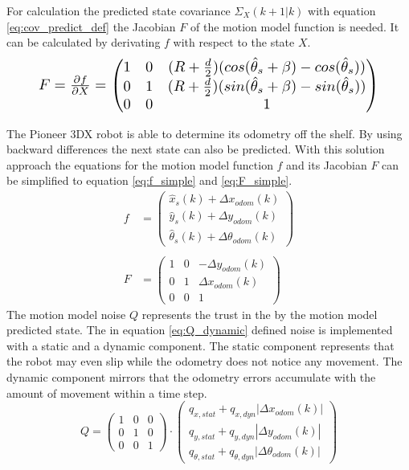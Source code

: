 For calculation the predicted state covariance $\Sigma_{X}(k+1|k)$ with equation \eqref{eq:cov_predict_def} the Jacobian $F$ of the motion model function is needed. It can be calculated by derivating $f$ with respect to the state $X$.
\begin{equation}\label{eq:MotionModel}
    \resizebox{0.88\hsize}{!}{%
        $F = \frac{\partial f}{\partial X} = \begin{pmatrix} 1 & 0 & (R+{\frac{d}{2}})(cos(\hat{\theta}_s+ \beta)-cos(\hat{\theta}_s)) \\ 0 & 1 & (R+\frac{d}{2})(sin(\hat{\theta}_s+ \beta)-sin(\hat{\theta}_s)) \\ 0 & 0 & 1\end{pmatrix}$%
        }
\end{equation}

The Pioneer 3DX robot is able to determine its odometry off the shelf. By using backward differences the next state can also be predicted. With this solution approach the equations for the motion model function $f$ and its Jacobian $F$ can be simplified to equation \eqref{eq:f_simple} and \eqref{eq:F_simple}. 
\begin{align}
f &= \begin{pmatrix} \hat{x}_s(k) + \Delta x_{odom}(k) \\ \hat{y}_s(k) + \Delta y_{odom}(k) \\ \hat{\theta}_s(k) + \Delta \theta_{odom}(k)\end{pmatrix}
\label{eq:f_simple} \\ \nonumber \\
F &= \begin{pmatrix} 1 & 0 & - \Delta y_{odom}(k) \\ 0 & 1 & \Delta x_{odom}(k) \\ 0 & 0 & 1\end{pmatrix} \label{eq:F_simple}
\end{align}
The motion model noise $Q$ represents the trust in the by the motion model predicted state. The in equation \eqref{eq:Q_dynamic} defined noise is implemented with a static and a dynamic component. The static component represents that the robot may even slip while the odometry does not notice any movement. The dynamic component mirrors that the odometry errors accumulate with the amount of movement within a time step.
\begin{equation}
Q = \begin{pmatrix} 1 & 0 & 0 \\ 0 & 1 & 0 \\ 0 & 0 & 1\end{pmatrix} \cdot \begin{pmatrix} q_{x,stat} + q_{x,dyn} |\Delta x_{odom}(k)| \\ q_{y,stat} + q_{y,dyn} |\Delta y_{odom}(k)|  \\ q_{\theta,stat} + q_{\theta,dyn} |\Delta \theta_{odom}(k)| \end{pmatrix}
\label{eq:Q_dynamic}
\end{equation}\\


